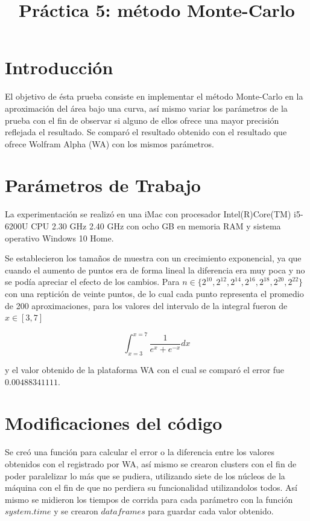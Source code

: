 \documentclass[a4paper]{article}
\title{Práctica 5: método Monte-Carlo}
\begin{document}
\maketitle

\section{Introducci\'on}
El objetivo de ésta prueba consiste en implementar el método Monte-Carlo en la aproximación del área bajo una curva, así mismo variar los parámetros de la prueba con el fin de observar si alguno de ellos ofrece una mayor precisión reflejada el resultado. Se comparó el resultado obtenido con el resultado que ofrece Wolfram Alpha (WA) con los mismos parámetros.

\section{Par\'ametros de Trabajo}
La experimentación se realizó en una iMac con procesador Intel(R)Core(TM) i5-6200U CPU 2.30 GHz 2.40 GHz con ocho GB en memoria RAM y sistema operativo Windows 10 Home.

Se establecieron los tamaños de muestra con un crecimiento exponencial, ya que cuando el aumento de puntos era de forma lineal la diferencia era muy poca y no se podía apreciar el efecto de los cambios. Para $n \in \{2^{10},2^{12},2^{14},2^{16},2^{18},2^{20},2^{22}\}$ con una reptición de veinte puntos, de lo cual cada punto representa el promedio de 200 aproximaciones, para los valores del intervalo de la integral fueron de $x \in [3,7]$ 

\begin{equation}
\int_{x=3}^{x=7} \dfrac{1}{e^x + e^{-x}} dx
\end{equation}

y el valor obtenido de la plataforma WA con el cual se comparó el error fue $0.00488341111$.
\section{Modificaciones del código}
Se creó una función para calcular el error o la diferencia entre los valores obtenidos con el registrado por WA, así mismo se crearon clusters con el fin de poder paralelizar lo más que se pudiera, utilizando siete de los núcleos de la máquina con el fin de que no perdiera su funcionalidad utilizandolos todos. Así mismo se midieron los tiempos de corrida para cada parámetro con la función $system.time$ y se crearon $data frames$ para guardar cada valor obtenido.
\end{document}
